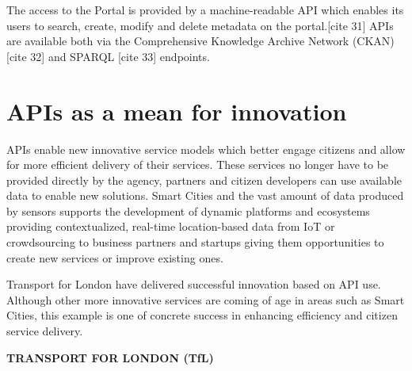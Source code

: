 The access to the Portal is provided by a machine-readable API which enables its
users to search, create, modify and delete metadata on the portal.[cite 31] APIs are
available both via the Comprehensive Knowledge Archive Network (CKAN) [cite 32] and
SPARQL [cite 33] endpoints.

\section{APIs as a mean for innovation}

APIs enable new innovative service models which better engage citizens and allow
for more efficient delivery of their services. These services no longer have to
be provided directly by the agency, partners and citizen developers can use
available data to enable new solutions. Smart Cities and the vast amount of data
produced by sensors supports the development of dynamic platforms and ecosystems
providing contextualized, real-time location-based data from IoT or crowdsourcing
to business partners and startups giving them opportunities to create new services
or improve existing ones.

Transport for London have delivered successful innovation based on API use.
Although other more innovative services are coming of age in areas such as
Smart Cities, this example is one of concrete success in enhancing efficiency
and citizen service delivery.

\textbf{TRANSPORT FOR LONDON (TfL)}

